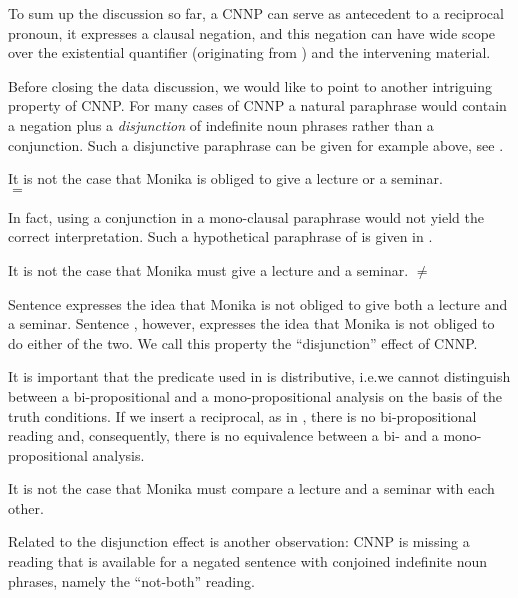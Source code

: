 \documentclass[output=paper]{langsci/langscibook}
\begin{document}
To sum up the discussion so far, a CNNP can serve as antecedent to a reciprocal pronoun, it expresses a clausal negation, and this negation can have wide scope over the existential quantifier
(originating from ) and the intervening material.

Before closing the data discussion, we would like to point to another intriguing property of CNNP. 
For many cases of CNNP a natural paraphrase would contain a negation plus a \emph{disjunction} of indefinite noun phrases rather than a conjunction. Such a disjunctive paraphrase can be given for example  above, see .

\ea \label{ex-tie-conj-paraOr}
It is not the case that Monika is obliged to give a lecture or a seminar.\\
\hspace*{\fill} $=$  
\z 

In fact, using a conjunction in a mono-clausal paraphrase would not yield the correct interpretation. Such a hypothetical paraphrase of  is given 
in . 

\ea \label{ex-tie-para-dis}
It is not the case that Monika must give a lecture and a seminar.
\hfill $\not=$  
\z 

Sentence  expresses the idea that Monika is not obliged to give both a lecture and a seminar. 
Sentence , however, expresses the idea that Monika is not obliged to do either of the two. 
We call this property the ``disjunction'' effect of CNNP. 

It is important that the predicate used in  is distributive, i.e.\@ we cannot distinguish between a bi-propositional and a mono-propositional analysis on the basis of the truth conditions. If we insert a reciprocal, as in , there is no bi-propositional reading and, consequently, there is 
no equivalence between a bi- and a mono-propositional analysis.

\ea \label{ex-tie-para-reci}
It is not the case that Monika must compare a lecture and a seminar with each other.
\z


Related to the disjunction effect is another observation:
CNNP is missing a reading that is available for a negated sentence with conjoined indefinite noun phrases, namely the ``not-both'' reading.
\end{document}
